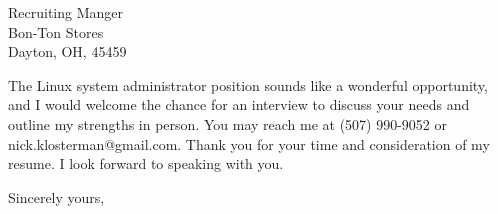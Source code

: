 \documentclass{letter} %
\newcommand{\position}{Linux system administrator }%
\begin{document}
\begin{letter}{Recruiting Manger \\
Bon-Ton Stores \\
Dayton, OH, 45459 \\

}
 
\noindent 
The \position position sounds like a wonderful opportunity, and I would welcome the chance for an interview to discuss your needs and outline my strengths in person. 
You may reach me at (507) 990-9052 or nick.klosterman@gmail.com.
Thank you for your time and consideration of my resume. I look forward to speaking with you.
 

\closing{Sincerely yours,} 
 

 

\end{letter}
 
\end{document}
